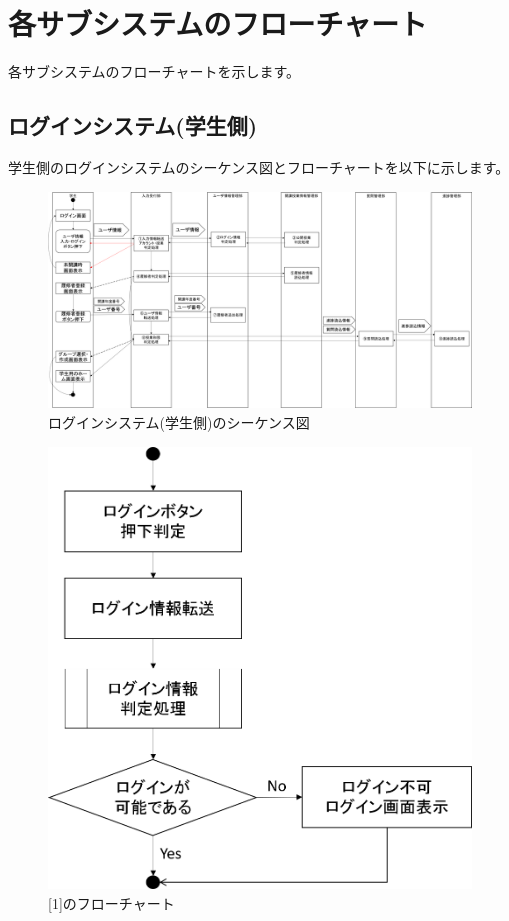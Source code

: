 \section{各サブシステムのフローチャート}
各サブシステムのフローチャートを示します。

\subsection{ログインシステム(学生側)}
学生側のログインシステムのシーケンス図とフローチャートを以下に示します。
\begin{figure}[htbp]
  \begin{center}
    \includegraphics[width=1\linewidth,clip]{./img/login/main.png}
    \caption{ログインシステム(学生側)のシーケンス図}\label{fig:loginseaquence}
  \end{center}
\end{figure}

\begin{figure}[htbp]
  \begin{center}
    \includegraphics[width=0.5\linewidth,clip]{./img/login/sub1.png}
    \caption{[1]のフローチャート}\label{fig:loginflow0}
  \end{center}
\end{figure}


